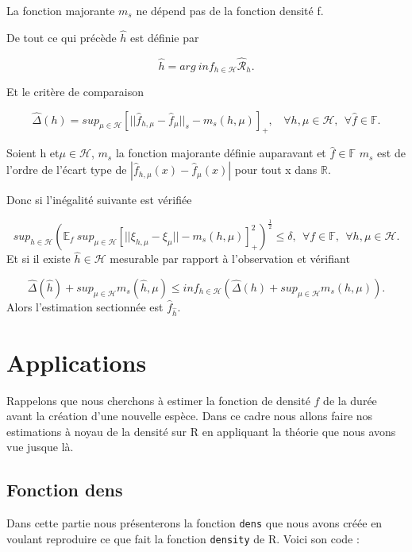 \documentclass[
]{book}
\begin{document}
\begin{rem}
La fonction majorante $m_s$ ne dépend pas de la fonction densité f.
\end{rem}

De tout ce qui précède \(\hat h\) est définie par\newline

\[
\hat h = arg~inf_{h \in \mathcal{H}} \mathcal{\hat R}_h.
\]

Et le critère de comparaison

\[
\hat{\Delta}(h)= sup_{\mu \in \mathcal{H}}[||\hat f_{h,\mu}-\hat f_\mu||_s - m_s(h,\mu)]_+,~~~~\forall h,\mu \in \mathcal H,~~\forall \hat f \in \mathbb F.
\]

\begin{rem}
Soient h et$\mu \in \mathcal H$, $m_s$ la fonction majorante définie auparavant et $\hat f \in \mathbb F$
$m_s$ est de l'ordre de l'écart type de $|\hat f_{h,\mu}(x)-\hat f_\mu(x)|$ pour tout x dans $\mathbb R$.
\end{rem}

Donc si l'inégalité suivante est vérifiée

\[
sup_{h \in \mathcal{H}}(\mathbb{E}_f~sup_{\mu \in \mathcal H}[||\xi_{h,\mu}-\xi_\mu || - m_s(h,\mu)]_+^2)^{\frac{1}{2}} \leq \delta,~~\forall f \in \mathbb{F}, ~~\forall h,\mu \in \mathcal H.
\]
Et si il existe \(\hat h \in \mathcal{H}\) mesurable par rapport à l'observation et vérifiant

\[
\hat{\Delta}(\hat h)+sup_{\mu \in \mathcal H}m_s(\hat h, \mu) \leq inf_{h \in \mathcal H}(\hat \Delta(h) +sup_{\mu \in \mathcal H}m_s(h,\mu)).
\]
Alors l'estimation sectionnée est \(\hat f_{\hat h}\).

\hypertarget{applications}{%
\chapter{Applications}\label{applications}}

Rappelons que nous cherchons à estimer la fonction de densité \(f\) de la durée avant la création d'une nouvelle espèce. Dans ce cadre nous allons faire nos estimations à noyau de la densité sur R en appliquant la théorie que nous avons vue jusque là.

\hypertarget{fonction-dens}{%
\section{Fonction dens}\label{fonction-dens}}

Dans cette partie nous présenterons la fonction \texttt{dens} que nous avons créée en voulant reproduire ce que fait la fonction \texttt{density} de R.
Voici son code :
\end{document}
